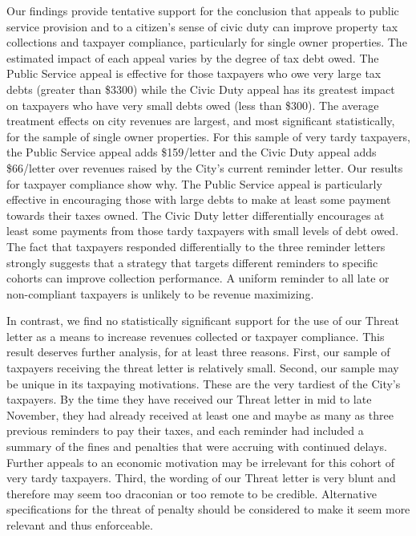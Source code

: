 \documentclass[12pt,titlepage]{article}
\begin{document}
Our findings provide tentative support for the conclusion that appeals
to public service provision and to a citizen's sense of civic duty can
improve property tax collections and taxpayer compliance, particularly
for single owner properties.  The estimated impact of each appeal
varies by the degree of tax debt owed.  The Public Service appeal is
effective for those taxpayers who owe very large tax debts (greater
than \$3300) while the Civic Duty appeal has its greatest impact on
taxpayers who have very small debts owed (less than \$300).  The
average treatment effects on city revenues are largest, and most
significant statistically, for the sample of single owner properties.
For this sample of very tardy taxpayers, the Public Service appeal
adds \$159/letter and the Civic Duty appeal adds \$66/letter over
revenues raised by the City's current reminder letter.  Our results
for taxpayer compliance show why.  The Public Service appeal is
particularly effective in encouraging those with large debts to make
at least some payment towards their taxes owned.  The Civic Duty
letter differentially encourages at least some payments from those
tardy taxpayers with small levels of debt owed.  The fact that
taxpayers responded differentially to the three reminder letters
strongly suggests that a strategy that targets different reminders to
specific cohorts can improve collection performance.  A uniform
reminder to all late or non-compliant taxpayers is unlikely to be
revenue maximizing.
	
In contrast, we find no statistically significant support for the use
of our Threat letter as a means to increase revenues collected or
taxpayer compliance.  This result deserves further analysis, for at
least three reasons.  First, our sample of taxpayers receiving the
threat letter is relatively small.  Second, our sample may be unique
in its taxpaying motivations.  These are the very tardiest of the
City's taxpayers.  By the time they have received our Threat letter in
mid to late November, they had already received at least one and maybe
as many as three previous reminders to pay their taxes, and each
reminder had included a summary of the fines and penalties that were
accruing with continued delays.  Further appeals to an economic
motivation may be irrelevant for this cohort of very tardy taxpayers.
Third, the wording of our Threat letter is very blunt and therefore
may seem too draconian or too remote to be credible.  Alternative
specifications for the threat of penalty should be considered to make
it seem more relevant and thus enforceable.
	
\end{document}
